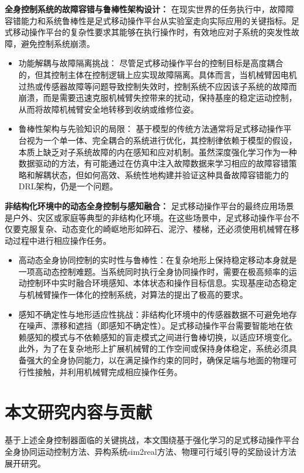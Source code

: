 \textbf{全身控制系统的故障容错与鲁棒性架构设计：}
在现实世界的任务执行中，故障障容错能力和系统鲁棒性是足式移动操作平台从实验室走向实际应用的关键指标。足式移动操作平台的复杂性要求其能够在执行操作时，有效地应对子系统的突发性故障，避免控制系统崩溃。
\begin{itemize}
    \item 功能解耦与故障隔离挑战： 尽管足式移动操作平台的控制目标是高度耦合的，但其控制主体在控制逻辑上应实现故障隔离。具体而言，当机械臂因电机过热或传感器故障等问题导致控制失效时，控制系统不应因该子系统的故障而崩溃，而是需要迅速克服机械臂失控带来的扰动，保持基座的稳定运动控制，从而将故障机械臂安全地转移到收纳或维修位姿。
    \item 鲁棒性架构与先验知识的局限： 基于模型的传统方法通常将足式移动操作平台视为一个单一体、完全耦合的系统进行优化，其控制律依赖于模型的假设，本质上缺乏对子系统故障的内在感知和应对机制。虽然深度强化学习作为一种数据驱动的方法，有可能通过在仿真中注入故障数据来学习相应的故障容错策略和解耦状态，但如何高效、系统性地构建并验证这种具备故障容错能力的DRL架构，仍是一个问题。
\end{itemize}

\textbf{非结构化环境中的动态全身控制与感知融合：}
足式移动操作平台的最终应用场景是户外、灾区或家庭等典型的非结构化环境。在这些场景中，足式移动操作平台不仅要克服复杂、动态变化的崎岖地形如碎石、泥泞、楼梯，还必须使用机械臂在移动过程中进行相应操作任务。
\begin{itemize}
    \item 高动态全身协同控制的实时性与鲁棒性：在复杂地形上保持稳定移动本身就是一项高动态控制难题。当系统同时执行全身协同操作时，需要在极高频率的运动控制环中实时融合环境感知、本体状态和操作目标信息。实现基座动态稳定与机械臂操作一体化的控制系统，对算法的提出了极高的要求。
    \item 感知不确定性与地形适应性挑战：非结构化环境中的传感器数据不可避免地存在噪声、漂移和遮挡（即感知不确定性）。足式移动操作平台需要智能地在依赖感知的模式与不依赖感知的盲走模式之间进行鲁棒切换，以适应环境变化。此外，为了在复杂地形上扩展机械臂的工作空间或保持身体稳定，系统必须具备强大的全身协同能力，以在满足操作约束的同时，确保足端与地面的物理可行性接触，并利用机械臂完成相应操作任务。
\end{itemize}

\section{本文研究内容与贡献}

基于上述全身控制器面临的关键挑战，本文围绕基于强化学习的足式移动操作平台全身协同运动控制方法、异构系统sim2real方法、物理可行域引导的奖励设计方法展开研究。

